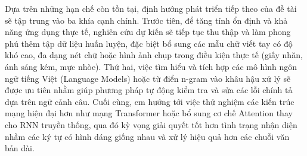 Dựa trên những hạn chế còn tồn tại, định hướng phát triển tiếp theo của đề tài sẽ tập trung vào ba khía cạnh chính. Trước tiên, để tăng tính ổn định và khả năng ứng dụng thực tế, nghiên cứu dự kiến sẽ tiếp tục thu thập và làm phong phú thêm tập dữ liệu huấn luyện, đặc biệt bổ sung các mẫu chữ viết tay có độ khó cao, đa dạng nét chữ hoặc hình ảnh chụp trong điều kiện thực tế (giấy nhăn, ánh sáng kém, mực nhòe). Thứ hai, việc tìm hiểu và tích hợp các mô hình ngôn ngữ tiếng Việt (Language Models) hoặc từ điển n-gram vào khâu hậu xử lý sẽ được ưu tiên nhằm giúp phương pháp tự động kiểm tra và sửa các lỗi chính tả dựa trên ngữ cảnh câu. Cuối cùng, em hướng tới việc thử nghiệm các kiến trúc mạng hiện đại hơn như mạng Transformer hoặc bổ sung cơ chế Attention thay cho RNN truyền thống, qua đó kỳ vọng giải quyết tốt hơn tình trạng nhận diện nhầm các ký tự có hình dáng giống nhau và xử lý hiệu quả hơn các chuỗi văn bản dài.
